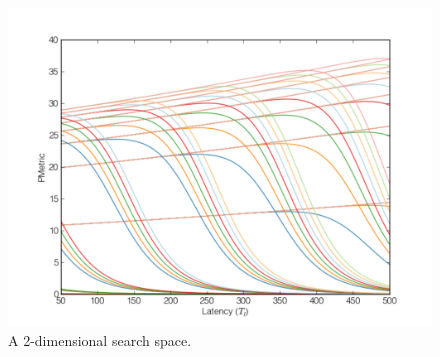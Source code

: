 \begin{figure}[htbp]
\begin{center}
\includegraphics[width=\columnwidth]{search_space_final}
\caption{A 2-dimensional search space.}
\label{search_space}
\end{center}
\end{figure}

